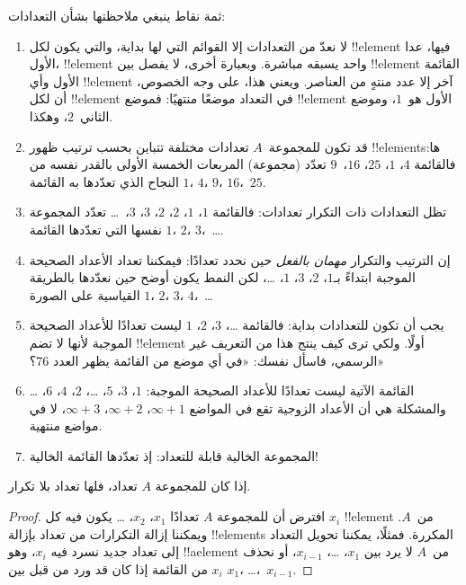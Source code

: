 \documentclass[../../../include/open-logic-section]{subfiles}
\begin{document}
\begin{explain}
ثمة نقاط ينبغي ملاحظتها بشأن التعدادات:
\begin{enumerate}
\item لا نعدّ من التعدادات إلا القوائم التي لها بداية، والتي يكون
  لكل !!{element} فيها، عدا الأول، !!{element} واحد يسبقه مباشرة.
  وبعبارة أخرى، لا يفصل بين !!{element} القائمة الأول وأي
  !!{element} آخر إلا عدد منتهٍ من العناصر. ويعني هذا، على وجه
  الخصوص، أن لكل !!{element} في التعداد موضعًا منتهيًا: فموضع
  !!{element} الأول هو~$1$، وموضع الثاني~$2$، وهكذا.
\item قد تكون للمجموعة~$A$ تعدادات مختلفة تتباين بحسب ترتيب ظهور
  !!{element}sها: فالقائمة $4$، $1$، $25$، $16$،~$9$ تعدّد
  (مجموعة) المربعات الخمسة الأولى بالقدر نفسه من النجاح الذي تعدّدها
  به القائمة $1$، $4$، $9$، $16$،~$25$.
\item تظل التعدادات ذات التكرار تعدادات: فالقائمة $1$، $1$، $2$،
  $2$، $3$، $3$،~\dots{} تعدّد المجموعة نفسها التي تعدّدها القائمة
  $1$، $2$، $3$،~\dots{}.
\item إن الترتيب والتكرار \emph{مهمان بالفعل} حين نحدد تعدادًا: فيمكننا
  تعداد الأعداد الصحيحة الموجبة ابتداءً بـ$1$، $2$، $3$، $1$،
  \dots{}، لكن النمط يكون أوضح حين نعدّدها بالطريقة القياسية على
  الصورة $1$، $2$، $3$، $4$،~\dots
\item يجب أن تكون للتعدادات بداية: فالقائمة \dots، $3$، $2$، $1$
  ليست تعدادًا للأعداد الصحيحة الموجبة لأنها لا تضم !!{element} أولًا.
  ولكي ترى كيف ينتج هذا من التعريف غير الرسمي، فاسأل نفسك: «في أي موضع
  من القائمة يظهر العدد 76؟»
\item القائمة الآتية ليست تعدادًا للأعداد الصحيحة الموجبة:
  $1$، $3$، $5$، \dots، $2$، $4$، $6$، \dots\@ والمشكلة هي أن
  الأعداد الزوجية تقع في المواضع $\infty + 1$، $\infty + 2$، $\infty +
  3$، لا في مواضع منتهية.
\item المجموعة الخالية قابلة للتعداد: إذ تعدّدها القائمة الخالية!{}
\end{enumerate}
\end{explain}

\begin{prop}
  إذا كان للمجموعة $A$ تعداد، فلها تعداد بلا تكرار.
\end{prop}

\begin{proof}
  افترض أن للمجموعة $A$ تعدادًا $x_1$، $x_2$، \dots{} يكون فيه كل
  $x_i$ !!{element} من~$A$. ويمكننا إزالة التكرارات من تعداد
  بإزالة !!{element}s المكررة. فمثلًا، يمكننا تحويل التعداد إلى
  تعداد جديد نسرد فيه $x_i$، وهو !!a{element} من~$A$ لا يرد
  بين $x_1$، \dots، $x_{i-1}$، أو نحذف $x_i$ من القائمة إذا كان
  قد ورد من قبل بين $x_1$، \dots،~$x_{i-1}$.
\end{proof}
\end{document}
